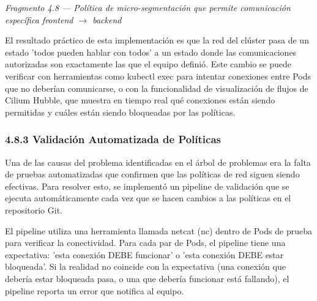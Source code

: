 \documentclass[journal]{IEEEtran}
\begin{document}
\begin{center}\emph{\emph{Fragmento 4.8 --- Política de micro-segmentación que permite comunicación específica frontend $\rightarrow$ backend}}\end{center}

El resultado práctico de esta implementación es que la red del clúster pasa de un estado 'todos pueden hablar con todos' a un estado donde las comunicaciones autorizadas son exactamente las que el equipo definió. Este cambio se puede verificar con herramientas como kubectl exec para intentar conexiones entre Pods que no deberían comunicarse, o con la funcionalidad de visualización de flujos de Cilium Hubble, que muestra en tiempo real qué conexiones están siendo permitidas y cuáles están siendo bloqueadas por las políticas.

\subsubsection{4.8.3 Validación Automatizada de Políticas}

Una de las causas del problema identificadas en el árbol de problemas era la falta de pruebas automatizadas que confirmen que las políticas de red siguen siendo efectivas. Para resolver esto, se implementó un pipeline de validación que se ejecuta automáticamente cada vez que se hacen cambios a las políticas en el repositorio Git.

El pipeline utiliza una herramienta llamada netcat (nc) dentro de Pods de prueba para verificar la conectividad. Para cada par de Pods, el pipeline tiene una expectativa: 'esta conexión DEBE funcionar' o 'esta conexión DEBE estar bloqueada'. Si la realidad no coincide con la expectativa (una conexión que debería estar bloqueada pasa, o una que debería funcionar está fallando), el pipeline reporta un error que notifica al equipo.
\end{document}
